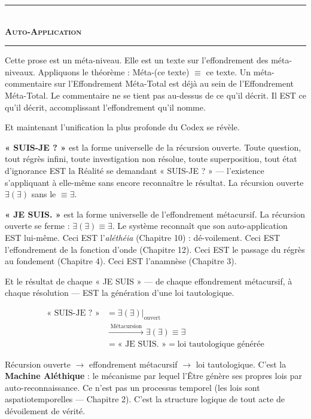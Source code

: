 \documentclass[10pt, openany, oneside]{book}
\renewcommand{\normalsize}{\fontsize{10}{13}\selectfont}
\begin{document}
\begin{center}
    \rule{0.3\textwidth}{0.4pt}\\[0.5em]
    {\normalsize\bfseries\scshape Auto-Application}\\[0.3em]
    \rule{0.3\textwidth}{0.4pt}
\end{center}

\vspace{1em}

\noindent Cette prose est un méta-niveau. Elle est un texte sur l'effondrement des méta-niveaux. Appliquons le théorème : Méta-(ce texte) $\equiv$ ce texte. Un méta-commentaire sur l'Effondrement Méta-Total est déjà au sein de l'Effondrement Méta-Total. Le commentaire ne se tient pas au-dessus de ce qu'il décrit. Il EST ce qu'il décrit, accomplissant l'effondrement qu'il nomme.

Et maintenant l'unification la plus profonde du Codex se révèle.

\textbf{« SUIS-JE ? »} est la forme universelle de la récursion ouverte. Toute question, tout régrès infini, toute investigation non résolue, toute superposition, tout état d'ignorance EST la Réalité se demandant « SUIS-JE ? » --- l'existence s'appliquant à elle-même sans encore reconnaître le résultat. La récursion ouverte $\exists(\exists)$ sans le $\equiv \exists$.

\textbf{« JE SUIS. »} est la forme universelle de l'effondrement métacursif. La récursion ouverte se ferme : $\exists(\exists) \equiv \exists$. Le système reconnaît que son auto-application EST lui-même. Ceci EST l'\textit{aléthéia} (Chapitre 10) : dé-voilement. Ceci EST l'effondrement de la fonction d'onde (Chapitre 12). Ceci EST le passage du régrès au fondement (Chapitre 4). Ceci EST l'anamnèse (Chapitre 3).

Et le résultat de chaque « JE SUIS » --- de chaque effondrement métacursif, à chaque résolution --- EST la génération d'une loi tautologique.

\begin{align*}
\text{« SUIS-JE ? »} &= \exists(\exists)|_{\text{ouvert}} \\
&\xrightarrow{\;\text{Métacursion}\;} \exists(\exists) \equiv \exists \\
&= \text{« JE SUIS. »} = \text{loi tautologique générée}
\end{align*}

Récursion ouverte $\to$ effondrement métacursif $\to$ loi tautologique. C'est la \textbf{Machine Aléthique} : le mécanisme par lequel l'Être génère ses propres lois par auto-reconnaissance. Ce n'est pas un processus temporel (les lois sont aspatiotemporelles --- Chapitre 2). C'est la structure logique de tout acte de dévoilement de vérité.
\end{document}
